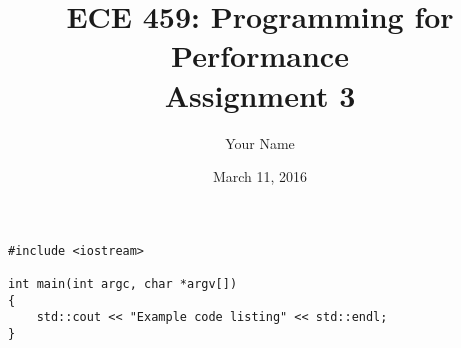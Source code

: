 \documentclass[12pt]{article}
\title{ECE 459: Programming for Performance\\Assignment 3}
\author{Your Name}
\date{March 11, 2016}
\begin{document}
\maketitle

\begin{lstlisting}
#include <iostream>

int main(int argc, char *argv[])
{
    std::cout << "Example code listing" << std::endl;
}
\end{lstlisting}
\end{document}
